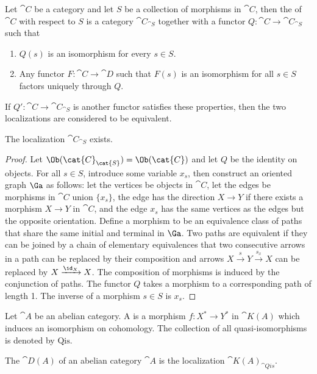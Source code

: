 \begin{definition}
    Let $\cat{C}$ be a category and let $S$ be a collection of morphisms in $\cat{C}$, then the  of $\cat{C}$ with respect to $S$ is a category ${\cat{C}}_{\cat{S}}$ together with a functor $Q:\cat{C}\to{\cat{C}}_{\cat{S}}$ such that 
    \begin{enumerate}
        \item $Q(s)$ is an isomorphism for every $s\in S$.
        \item Any functor $F:\cat{C}\to\cat{D}$ such that $F(s)$ is an isomorphism for all $s\in S$ factors uniquely through $Q$.
    \end{enumerate}
    If $Q':\cat{C}\to{\cat{C}}_{\cat{S}}$ is another functor satisfies these properties, then the two localizations are considered to be equivalent. 
\end{definition}
\begin{proposition}
    The localization ${\cat{C}}_{\cat{S}}$ exists.
\end{proposition}
\begin{proof}
    Let $\Ob({\cat{C}}_{\cat{S}})=\Ob(\cat{C})$ and let $Q$ be the identity on objects. For all $s\in S$, introduce some variable ${x}_{s}$, then construct an oriented graph $\Ga$ as follows: let the vertices be objects in $\cat{C}$, let the edges be morphisms in $\cat{C}$ union $\{{x}_{s}\}$, the edge has the direction $X\to Y$ if there exists a morphism $X\to Y$ in $\cat{C}$, and the edge ${x}_{s}$ has the same vertices as the edges but the opposite orientation. Define a morphism to be an equivalence class of paths that share the same initial and terminal in $\Ga$. Two paths are equivalent if they can be joined by a chain of elementary equivalences that two consecutive arrows in a path can be replaced by their composition and  arrows $X\xrightarrow{s}Y\xrightarrow{{s}_{x}}X$ can be replaced by $X\xrightarrow{{\id}_{X}}X$. The composition of morphisms is induced by the conjunction of paths. The functor $Q$ takes a morphism to a corresponding path of length 1. The inverse of a morphism $s\in S$ is ${x}_{s}$. 
\end{proof}
\begin{definition}
    Let $\cat{A}$ be an abelian category. A  is a morphism $f:{X}^{*}\to{Y}^{*}$ in $\cat{K(A)}$ which induces an isomorphism on cohomology. The collection of all quasi-isomorphisms is denoted by $\text{Qis}$.
\end{definition}
\begin{definition}
    The  $\cat{D(A)}$ of an abelian category $\cat{A}$ is the localization ${\cat{K(A)}}_{\cat{Qis}}$.
\end{definition}
